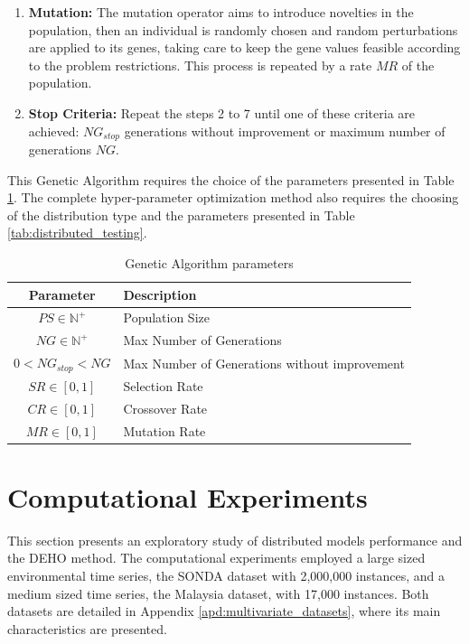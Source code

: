 \begin{enumerate}
    \item \textbf{Mutation:} The mutation operator aims to introduce novelties in the population, then an individual is randomly chosen and random perturbations are applied to its genes, taking care to keep the gene values feasible according to the problem restrictions. This process is repeated by a rate $MR$ of the population.

    \item \textbf{Stop Criteria:} Repeat the steps 2 to 7 until one of these criteria are achieved: $NG_{stop}$ generations without improvement or maximum number of generations $NG$.
\end{enumerate}

This Genetic Algorithm requires the choice of the  parameters presented in Table \ref{tab:genetic_algoritm}. The complete hyper-parameter optimization method also requires the choosing of the distribution type and the parameters presented in Table \ref{tab:distributed_testing}.

\begin{table}[htb]
    \centering
    \begin{tabular}{|c|p{7cm}|} \hline
        \textbf{Parameter} & \textbf{Description}  \\ \hline
         $PS \in \mathbb{N}^+$ & Population Size \\ \hline
         $NG \in \mathbb{N}^+$ & Max Number of Generations \\ \hline 
         $0 < NG_{stop} < NG$ & Max Number of Generations without improvement \\ \hline 
         $SR \in [0,1]$ & Selection Rate \\ \hline 
         $CR \in [0,1]$ & Crossover Rate \\ \hline 
         $MR \in [0,1]$ & Mutation Rate \\ \hline 
    \end{tabular}
    \caption{Genetic Algorithm parameters}
    \label{tab:genetic_algoritm}
\end{table}

\section{Computational Experiments}
\label{sec:scalability_experiments}

This section presents an exploratory study of distributed models performance and the DEHO method. The computational experiments employed a large sized environmental time series, the SONDA dataset with 2,000,000 instances, and a medium sized time series, the Malaysia dataset, with 17,000 instances. Both datasets are detailed in Appendix \ref{apd:multivariate_datasets}, where its main characteristics are presented.

